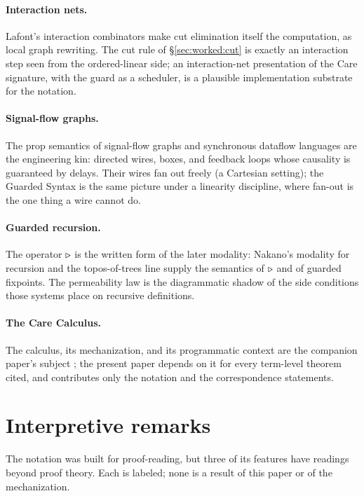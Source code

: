 \documentclass{eptcs}
\begin{document}
\paragraph{Interaction nets.} Lafont's interaction combinators
\cite{lafont1997} make cut elimination itself the computation, as local
graph rewriting. The cut rule of \S\ref{sec:worked:cut} is exactly an
interaction step seen from the ordered-linear side; an interaction-net
presentation of the Care signature, with the guard as a scheduler, is a
plausible implementation substrate for the notation.

\paragraph{Signal-flow graphs.} The prop semantics of signal-flow graphs
\cite{bsz2014} and synchronous dataflow languages \cite{lustre1991} are
the engineering kin: directed wires, boxes, and feedback loops whose
causality is guaranteed by delays. Their wires fan out freely (a
Cartesian setting); the Guarded Syntax is the same picture under a
linearity discipline, where fan-out is the one thing a wire cannot do.

\paragraph{Guarded recursion.} The operator $\triangleright$ is the written form of
the later modality: Nakano's modality for recursion \cite{nakano2000}
and the topos-of-trees line \cite{birkedal2012} supply the semantics of
$\triangleright$ and of guarded fixpoints. The permeability law is the
diagrammatic shadow of the side conditions those systems place on
recursive definitions.

\paragraph{The Care Calculus.} The calculus, its mechanization, and its
programmatic context are the companion paper's subject
\cite{dcarecompanion}; the present paper depends on it for every
term-level theorem cited, and contributes only the notation and the
correspondence statements.

\section{Interpretive remarks}\label{sec:remarks}

The notation was built for proof-reading, but three of its features have
readings beyond proof theory. Each is labeled; none is a result of this
paper or of the mechanization.
\end{document}
